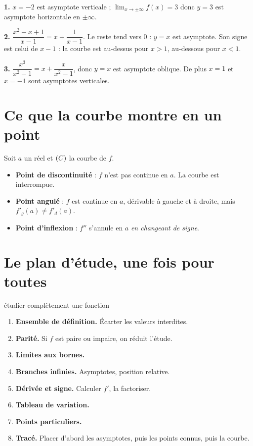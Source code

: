 \begin{corrige}
\textbf{1.} $x = -2$ est asymptote verticale ; $\lim_{x \to \pm\infty} f(x) = 3$ donc $y = 3$ est
asymptote horizontale en $\pm\infty$.

\textbf{2.} $\dfrac{x^{2}-x+1}{x-1} = x + \dfrac{1}{x-1}$. Le reste tend vers
$0$ : $y = x$ est asymptote. Son signe est celui de $x-1$ : la courbe est
au-dessus pour $x>1$, au-dessous pour $x<1$.

\textbf{3.} $\dfrac{x^{3}}{x^{2}-1} = x + \dfrac{x}{x^{2}-1}$, donc $y=x$ est
asymptote oblique. De plus $x = 1$ et $x = -1$ sont asymptotes verticales.
\end{corrige}

\section{Ce que la courbe montre en un point}

\begin{definition}
Soit $a$ un réel et $(C)$ la courbe de $f$.
\begin{itemize}[leftmargin=1.4em, itemsep=0.25em]
  \item \textbf{Point de discontinuité} : $f$ n'est pas continue en $a$. La
        courbe est interrompue.
  \item \textbf{Point angulé} : $f$ est continue en $a$, dérivable à gauche et
        à droite, mais $f'_{g}(a) \neq f'_{d}(a)$.
  \item \textbf{Point d'inflexion} : $f''$ s'annule en $a$ \emph{en changeant
        de signe}.
\end{itemize}
\end{definition}

\section{Le plan d'étude, une fois pour toutes}

\begin{methode}{étudier complètement une fonction}
\begin{enumerate}[label=\textbf{\arabic*.}, leftmargin=*, itemsep=0.28em]
  \item \textbf{Ensemble de définition.} Écarter les valeurs interdites.
  \item \textbf{Parité.} Si $f$ est paire ou impaire, on réduit l'étude.
  \item \textbf{Limites aux bornes.}
  \item \textbf{Branches infinies.} Asymptotes, position relative.
  \item \textbf{Dérivée et signe.} Calculer $f'$, la factoriser.
  \item \textbf{Tableau de variation.}
  \item \textbf{Points particuliers.}
  \item \textbf{Tracé.} Placer d'abord les asymptotes, puis les points connus,
        puis la courbe.
\end{enumerate}
\end{methode}

